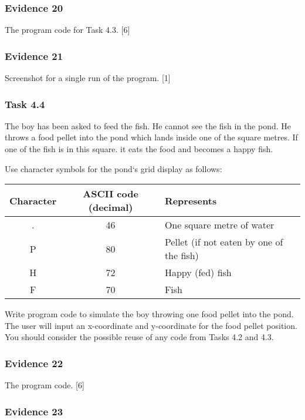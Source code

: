 \subsubsection*{Evidence 20}

The program code for Task 4.3. \hfill{} {[}6{]}

\subsubsection*{Evidence 21}

Screenshot for a single run of the program. \hfill{} {[}1{]}

\subsubsection*{Task 4.4}

The boy has been asked to feed the fish. He cannot see the fish in
the pond. He throws a food pellet into the pond which lands inside
one of the square metres. If one of the fish is in this square. it
eats the food and becomes a happy fish. 

Use character symbols for the pond\textquoteleft s grid display as
follows: 
\begin{center}
\begin{tabular}{|c|c|l|}
\hline 
Character & ASCII code (decimal) & \texttt{\hspace{0.01\columnwidth}}Represents\tabularnewline
\hline 
. & 46 & One square metre of water\tabularnewline
\hline 
P & 80 & Pellet (if not eaten by one of the fish)\tabularnewline
\hline 
H & 72 & Happy (fed) fish\tabularnewline
\hline 
F & 70 & Fish\tabularnewline
\hline 
\end{tabular}
\par\end{center}

Write program code to simulate the boy throwing one food pellet into
the pond. The user will input an x-coordinate and y-coordinate for
the food pellet position. You should consider the possible reuse of
any code from Tasks 4.2 and 4.3.

\subsubsection*{Evidence 22}

The program code.\hfill{} {[}6{]}

\subsubsection*{Evidence 23}

